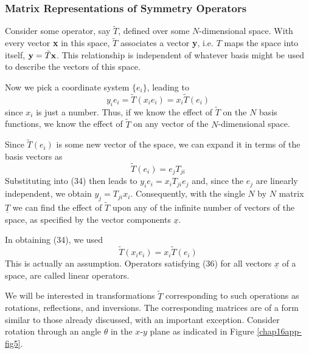 \subsubsection{Matrix Representations of Symmetry Operators}

Consider some operator, say ${\tilde{T}}$, defined over some 
$N$-dimensional space.  With every vector {\bf x} in this space, 
${\tilde{T}}$ associates a vector {\bf y}, i.e. $T$ maps the space 
into itself, ${\bf y} = {\tilde{T}} {\bf x}$.    This relationship is 
independent of whatever basis might be used to describe the vectors of 
this space.

Now we pick a coordinate system $\{e_i\}$, leading to
\begin{equation}
y_i e_i = {\tilde{T}} \left( x_i e_i \right) = x_i {\tilde{T}} \left( 
e_i \right)
\label{chap16app-eqno34}
\end{equation}
since $x_i$ is just a number.  Thus, if we know the effect of 
${\tilde{T}}$ on the $N$ basis functions, we know the effect of 
${\tilde{T}}$ on any vector of the $N$-dimensional space.

Since ${\tilde{T}}(e_i)$ is some new vector of the space, we can 
expand it in terms of the basis vectors as
\begin{equation}
{\tilde{T}} \left( e_i \right) = e_j T_{ji}
\label{chap16app-eqno35}
\end{equation}
Substituting into (34) then leads to $y_ie_i = x_i T_{ji}e_j$ and, 
since the $e_j$ are linearly independent, we obtain $y_j = 
T_{ji}x_i$.  Consequently, with the single $N$ by $N$ matrix 
$\underline{T}$ we can find the effect of ${\tilde{T}}$ upon any of 
the infinite number of vectors of the space, as specified by the 
vector components $\underline{x}$.

In obtaining (34), we used
\begin{equation}
{\tilde{T}} \left( x_i e_i \right) = x_i {\tilde{T}} \left( e_i 
\right)
\label{chap16app-eqno36}
\end{equation}
This is actually an assumption.  Operators satisfying (36) for all 
vectors $\underline{x}$ of a space, are called linear operators.

We will be interested in transformations ${\tilde{T}}$ corresponding
to such operations as rotations, reflections, and inversions.  The
corresponding matrices are of a form similar to those already
discussed, with an important exception.  Consider rotation through an
angle $\theta$ in the $x$-$y$ plane as indicated in Figure
\ref{chap16app-fig5}.


